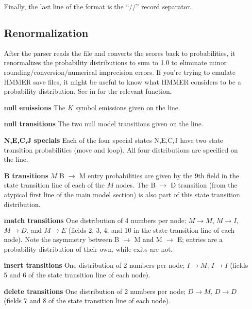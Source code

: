 Finally, the last line of the format is the ``//'' record separator.

\subsection{Renormalization}

After the parser reads the file and converts the scores back to
probabilities, it renormalizes the probability distributions to sum to
1.0 to eliminate minor rounding/conversion/numerical imprecision
errors.  If you're trying to emulate HMMER save files, it might be
useful to know what HMMER considers to be a probability
distribution. See
 in  for the relevant
function.

\begin{wideitem}

\item [\textbf{null emissions}] The $K$ symbol emissions 
given on the  line.

\item [\textbf{null transitions}] The two null model transitions
given on the  line.

\item [\textbf{N,E,C,J specials}] Each of the four special states N,E,C,J have two
state transition probabilities (move and loop). All four distributions
are specified on the  line.

\item [\textbf{B transitions}] $M$ B $\rightarrow$
M entry probabilities are given by the 9th field in the state
transition line of each of the $M$ nodes. The B $\rightarrow$ D
transition (from the atypical first line of the main model section) is
also part of this state transition distribution.

\item [\textbf{match transitions}] One distribution of 4 numbers per node; $M \rightarrow M$, 
$M \rightarrow I$, $M \rightarrow D$, and $M \rightarrow E$ (fields 2,
3, 4, and 10 in the state transition line of each node). Note the
asymmetry between B $\rightarrow$ M and M $\rightarrow$ E; entries are
a probability distribution of their own, while exits are not.

\item [\textbf{insert transitions}] One distribution of 2 numbers per node; $I \rightarrow M$, 
$I \rightarrow I$ (fields 5 and 6 of the state transition line of each
node).

\item [\textbf{delete transitions}] One distribution of 2 numbers per
node; $D \rightarrow M$, $D \rightarrow D$ (fields 7 and 8 of the
state transition line of each node).


\end{wideitem}
